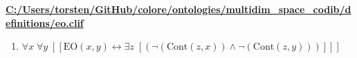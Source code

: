 \documentclass{article}
\begin{document}
\textbf{\url{C:/Users/torsten/GitHub/colore/ontologies/multidim\_space\_codib/definitions/eo.clif}}

\begin{enumerate}
\item $\forall x\; \forall y\;  \left[ \left[ \textrm{EO}(x,y) \leftrightarrow \exists z\;  \left[ \left(\neg \left(\textrm{Cont}(z,x)\right) \land \neg \left(\textrm{Cont}(z,y)\right)\right) \right] \right] \right]$
\end{enumerate}
\end{document}
